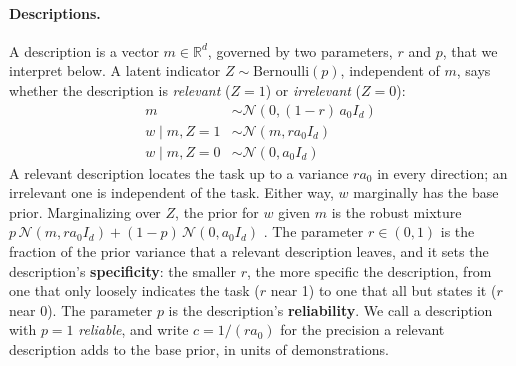 \documentclass{article}
\newcommand{\R}{\mathbb{R}}
\begin{document}
\paragraph{Descriptions.} A description is a vector $m \in \R^d$, governed by two parameters, $r$ and $p$, that we interpret below. A latent indicator $Z \sim \mathrm{Bernoulli}(p)$, independent of $m$, says whether the description is \emph{relevant} ($Z = 1$) or \emph{irrelevant} ($Z = 0$):
\begin{align*}
    m &\sim \mathcal{N}(0, (1-r)\,a_0 I_d) \\
    w \mid m, Z=1 &\sim \mathcal{N}(m, r a_0 I_d) \\
    w \mid m, Z=0 &\sim \mathcal{N}(0, a_0 I_d)
\end{align*}
A relevant description locates the task up to a variance $r a_0$ in every direction; an irrelevant one is independent of the task. Either way, $w$ marginally has the base prior. Marginalizing over $Z$, the prior for $w$ given $m$ is the robust mixture $p\,\mathcal{N}(m, r a_0 I_d) + (1-p)\,\mathcal{N}(0, a_0 I_d)$ \citep{schmidli2014}. The parameter $r \in (0, 1)$ is the fraction of the prior variance that a relevant description leaves, and it sets the description's \textbf{specificity}: the smaller $r$, the more specific the description, from one that only loosely indicates the task ($r$ near 1) to one that all but states it ($r$ near 0). The parameter $p$ is the description's \textbf{reliability}. We call a description with $p = 1$ \emph{reliable}, and write $c = 1/(r a_0)$ for the precision a relevant description adds to the base prior, in units of demonstrations.
\end{document}
